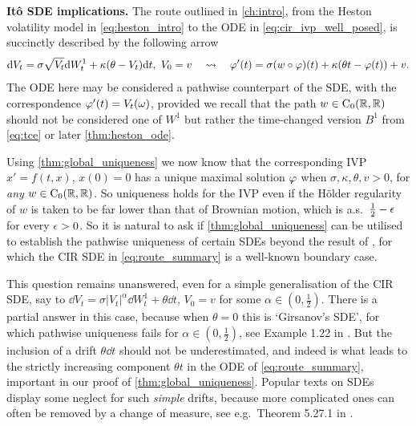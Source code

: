 \vspace{3mm}\textbf{It\^o SDE implications.} The route outlined in \autoref{ch:intro}, from the Heston volatility model in \autoref{eq:heston_intro} to the ODE in \autoref{eq:cir_ivp_well_posed}, is succinctly described by the following arrow
\begin{equation}\label{eq:route_summary}
    \dd V_t = \sigma\sqrt{V_t}\dd W^1_t + \kappa(\theta - V_t)\dd t,\ V_0=v\quad \rightsquigarrow\quad \vp'(t) = \sigma (w\circ\vp)(t) + \kappa(\theta t - \vp(t)) + v.
\end{equation}
The ODE here may be considered a pathwise counterpart of the SDE, with the correspondence $\varphi'(t)=V_t(\omega)$, provided we recall that the path $w\in\mathrm{C}_0(\mathbb{R},\mathbb{R})$ should not be considered one of $W^1$ but rather the time-changed version $B^1$ from \autoref{eq:tce} or later \autoref{thm:heston_ode}.

Using \autoref{thm:global_uniqueness} we now know that the corresponding IVP $x'=f(t,x)$, $x(0)=0$ has a unique maximal solution $\varphi$ when $\sigma,\kappa,\theta,v>0$, for \emph{any} $w\in\mathrm{C}_0(\mathbb{R},\mathbb{R})$. So uniqueness holds for the IVP even if the H\"older regularity of $w$ is taken to be far lower than that of Brownian motion, which is a.s.~$\frac12-\epsilon$ for every $\epsilon>0$. So it is natural to ask if \autoref{thm:global_uniqueness} can be utilised to establish the pathwise uniqueness of certain SDEs beyond the result of \cite{yamada_1971}, for which the CIR SDE in \autoref{eq:route_summary} is a well-known boundary case.

This question remains unanswered, even for a simple generalisation of the CIR SDE, say to $\dd V_t = \sigma |V_t|^\alpha\dd W^1_t + \theta\dd t$, $V_0=v$ for some $\alpha\in(0,\frac12)$. There is a partial answer in this case, because when $\theta=0$ this is `Girsanov's SDE', for which pathwise uniqueness fails for $\alpha\in(0,\frac12)$, see Example 1.22 in \cite{cherny_2005}. But the inclusion of a drift $\theta \dd t$ should not be underestimated, and indeed is what leads to the strictly increasing component $\theta t$ in the ODE of \autoref{eq:route_summary}, important in our proof of \autoref{thm:global_uniqueness}. Popular texts on SDEs display some neglect for such \emph{simple} drifts, because more complicated ones can often be removed by a change of measure, see e.g.~Theorem 5.27.1 in \cite{rogers_2000}.

